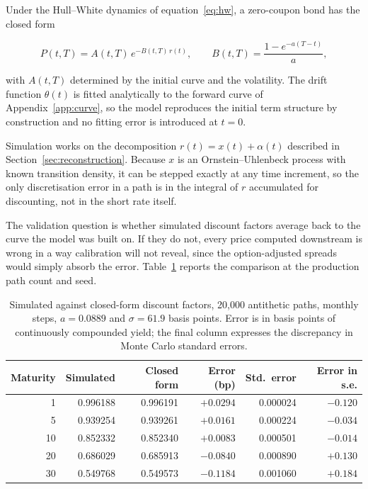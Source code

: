 Under the Hull--White dynamics of equation~\eqref{eq:hw}, a zero-coupon bond has the
closed form

\begin{equation}
P(t,T) = A(t,T)\, e^{-B(t,T)\, r(t)},
\qquad
B(t,T) = \frac{1 - e^{-a(T-t)}}{a},
\label{eq:zcb}
\end{equation}

with $A(t,T)$ determined by the initial curve and the volatility. The drift function
$\theta(t)$ is fitted analytically to the forward curve of
Appendix~\ref{app:curve}, so the model reproduces the initial term structure by
construction and no fitting error is introduced at $t=0$.

Simulation works on the decomposition $r(t) = x(t) + \alpha(t)$ described in
Section~\ref{sec:reconstruction}. Because $x$ is an Ornstein--Uhlenbeck process with
known transition density, it can be stepped exactly at any time increment, so the
only discretisation error in a path is in the integral of $r$ accumulated for
discounting, not in the short rate itself.

The validation question is whether simulated discount factors average back to the
curve the model was built on. If they do not, every price computed downstream is
wrong in a way calibration will not reveal, since the option-adjusted spreads would
simply absorb the error. Table~\ref{tab:mc} reports the comparison at the production
path count and seed.

\begin{table}[htbp]
\centering
\caption{Simulated against closed-form discount factors, 20,000 antithetic paths,
monthly steps, $a = 0.0889$ and $\sigma = 61.9$ basis points. Error is in basis
points of continuously compounded yield; the final column expresses the discrepancy
in Monte Carlo standard errors.}
\label{tab:mc}
\small
\begin{tabular}{rrrrrr}
\toprule
Maturity & Simulated & Closed form & Error (bp) & Std.\ error & Error in s.e. \\
\midrule
1  & 0.996188 & 0.996191 & $+0.0294$ & 0.000024 & $-0.120$ \\
5  & 0.939254 & 0.939261 & $+0.0161$ & 0.000224 & $-0.034$ \\
10 & 0.852332 & 0.852340 & $+0.0083$ & 0.000501 & $-0.014$ \\
20 & 0.686029 & 0.685913 & $-0.0840$ & 0.000890 & $+0.130$ \\
30 & 0.549768 & 0.549573 & $-0.1184$ & 0.001060 & $+0.184$ \\
\bottomrule
\end{tabular}
\end{table}

